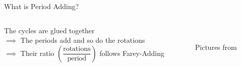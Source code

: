 \begin{frame}{What is Period Adding?}
\begin{columns}
\begin{column}{.6 \textwidth}
            \pause
            \vspace{1em}
            The cycles are glued together \\
            $\implies$ The periods add and so do the rotations \\ \pause
            $\implies$ Their ratio $\left(\dfrac{\text{rotations}}{\text{period}}\right)$ follows Farey-Adding
        \end{column}
        \begin{column}{.4 \textwidth}
            \vspace{-3em}
            \begin{figure}
                \centering
                \\
            \end{figure}
            \begin{flushright}
                Pictures from \cite{simpson2010}
            \end{flushright}
        \end{column}
    \end{columns}
\end{frame}

